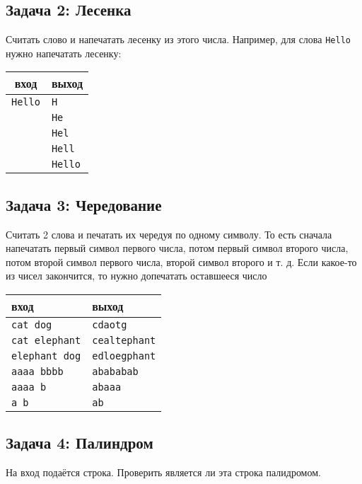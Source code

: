 \documentclass{article}
\begin{document}
\subsection*{Задача 2: Лесенка}
Считать слово и напечатать лесенку из этого числа. Например, для слова \texttt{Hello} нужно напечатать лесенку: 
\begin{center}
\begin{center}
\begin{tabular}{ c | l }
 вход & выход \\ \hline
 \texttt{Hello} & \texttt{H}  \\ 
 & \texttt{He} \\
 & \texttt{Hel} \\
 & \texttt{Hell} \\
 & \texttt{Hello}\\ 
\end{tabular}
\end{center}
\end{center}

\subsection*{Задача 3: Чередование}
Считать 2 слова и печатать их чередуя по одному символу. То есть сначала напечатать первый символ первого числа, потом первый символ второго числа, потом второй символ первого числа, второй символ второго и т. д. Если какое-то из чисел закончится, то нужно допечатать оставшееся число
\begin{center}
\begin{tabular}{ l | l }
 вход & выход \\ \hline
 \texttt{cat dog} & \texttt{cdaotg}  \\ 
 \texttt{cat elephant} & \texttt{cealtephant} \\
 \texttt{elephant dog} & \texttt{edloegphant} \\
 \texttt{aaaa bbbb} & \texttt{abababab} \\
 \texttt{aaaa b} & \texttt{abaaa}\\ 
 \texttt{a b} & \texttt{ab}\\ 
\end{tabular}
\end{center}



\subsection*{Задача 4: Палиндром}
На вход подаётся строка. Проверить является ли эта строка палидромом.
\end{document}
